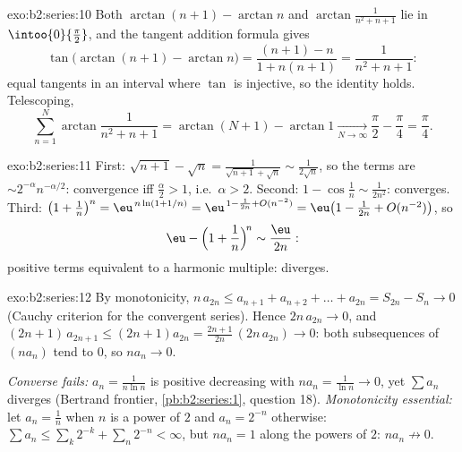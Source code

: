 \begin{solution}{exo:b2:series:10}
Both $\arctan(n+1) - \arctan n$ and
$\arctan\frac{1}{n^2+n+1}$ lie in $\intoo{0}{\frac\pi2}$, and the
tangent addition formula gives
\[
\tan\bigl(\arctan(n{+}1) - \arctan n\bigr)
= \frac{(n+1) - n}{1 + n(n+1)} = \frac{1}{n^2 + n + 1} :
\]
equal tangents in an interval where $\tan$ is injective, so the
identity holds. Telescoping,
\[
\sum_{n=1}^{N}\arctan\frac{1}{n^2+n+1}
= \arctan(N{+}1) - \arctan 1 \xrightarrow[N\to\infty]{}
\frac\pi2 - \frac\pi4 = \frac\pi4 .
\]

\end{solution}

\begin{solution}{exo:b2:series:11}
First: $\sqrt{n+1} - \sqrt n = \frac{1}{\sqrt{n+1} + \sqrt n}
\sim \frac{1}{2\sqrt n}$, so the terms are $\sim
2^{-\alpha}n^{-\alpha/2}$: convergence iff $\frac\alpha2 > 1$,
i.e.\ $\alpha > 2$. Second: $1 - \cos\frac1n \sim
\frac{1}{2n^2}$: converges. Third: $\bigl(1 + \frac1n\bigr)^n =
\eu^{\,n\ln(1 + 1/n)} = \eu^{\,1 - \frac1{2n} + O(n^{-2})} =
\eu\bigl(1 - \frac{1}{2n} + O(n^{-2})\bigr)$, so
\[
\eu - \Bigl(1 + \frac1n\Bigr)^{\!n} \sim \frac{\eu}{2n} :
\]
positive terms equivalent to a harmonic multiple: diverges.
\end{solution}

\begin{solution}{exo:b2:series:12}
By monotonicity, $n\,a_{2n} \leq a_{n+1} + a_{n+2} + \dots +
a_{2n} = S_{2n} - S_n \to 0$ (Cauchy criterion for the
convergent series). Hence $2n\,a_{2n} \to 0$, and $(2n{+}1)\,
a_{2n+1} \leq (2n{+}1)a_{2n} = \frac{2n+1}{2n}\,(2n\,a_{2n}) \to
0$: both subsequences of $(na_n)$ tend to $0$, so $na_n \to 0$.

\emph{Converse fails:} $a_n = \frac1{n\ln n}$ is positive
decreasing with $na_n = \frac1{\ln n} \to 0$, yet $\sum a_n$
diverges (Bertrand frontier, \cref{pb:b2:series:1}, question
18). \emph{Monotonicity essential:} let $a_n = \frac1n$ when $n$
is a power of $2$ and $a_n = 2^{-n}$ otherwise: $\sum a_n \leq
\sum_k 2^{-k} + \sum_n 2^{-n} < \infty$, but $na_n = 1$ along
the powers of $2$: $na_n \not\to 0$.
\end{solution}

